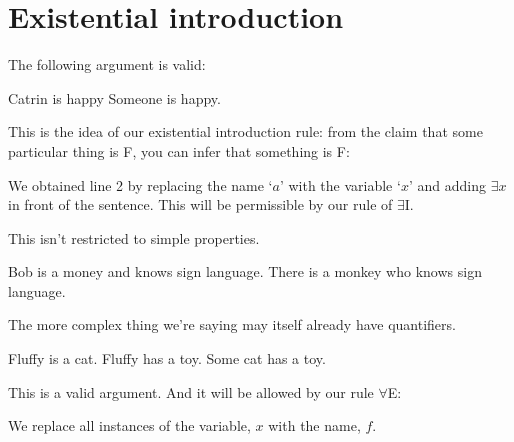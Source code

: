 \section{Existential introduction}
The following argument is valid:
\begin{earg}
\prem Catrin is happy
\conc Someone is happy.
\end{earg}

This is the idea of our existential introduction rule: from the claim that some particular thing is F, you can infer that something is F:
\begin{fitchproof}
	 
\end{fitchproof}
We obtained line 2 by replacing the name `$a$' with the variable `$x$' and adding $\exists x$ in front of the sentence. This will be permissible by our rule of $\exists$I.

This isn't restricted to simple properties.
\begin{earg}
\prem Bob is a money and knows sign language.
\conc There is a monkey who knows sign language.
\end{earg}
\begin{fitchproof}
	 
\end{fitchproof}
The more complex thing we're saying may itself already have quantifiers. 
\begin{earg}
	\prem Fluffy is a cat.
	\prem Fluffy has a toy.
	\conc Some cat has a toy. 
\end{earg}
This is a valid argument. And it will be allowed by our rule $\forall$E:
\begin{fitchproof}
\end{fitchproof}
We replace all instances of the variable, $x$ with the name, $f$. 




